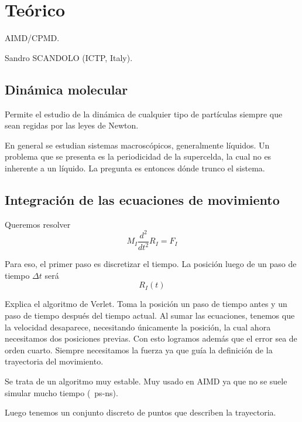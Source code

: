 \section{Teórico}

   AIMD/CPMD.

  	Sandro SCANDOLO (ICTP, Italy).

\subsection{Dinámica molecular}

  Permite el estudio de la dinámica de cualquier tipo de partículas siempre que sean regidas por las leyes de Newton.

  En general se estudian sistemas macroscópicos, generalmente líquidos. Un problema que se presenta es la periodicidad de la supercelda, la cual no es inherente a un líquido. La pregunta es entonces dónde trunco el sistema.


\subsection{Integración de las ecuaciones de movimiento}

  Queremos resolver
    $$M_I \frac{d^2}{dt^2} R_I = F_I$$

  Para eso, el primer paso es discretizar el tiempo. La posición luego de un paso de tiempo $\Delta t$ será
    $$R_I (t)$$

  Explica el algoritmo de Verlet. Toma la posición un paso de tiempo antes y un paso de tiempo después del tiempo actual. Al sumar las ecuaciones, tenemos que la velocidad desaparece, necesitando únicamente la posición, la cual ahora necesitamos dos posiciones previas. Con esto logramos además que el error sea de orden cuarto. Siempre necesitamos la fuerza ya que guía la definición de la trayectoria del movimiento.


  Se trata de un algoritmo muy estable. Muy usado en AIMD ya que no se suele simular mucho tiempo (~ps-ns).

  Luego tenemos un conjunto discreto de puntos que describen la trayectoria.

